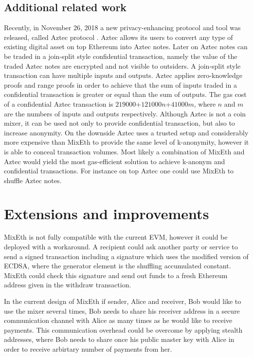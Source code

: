 \documentclass[a4paper]{article}
\theoremstyle{definition}
\begin{document}
\subsection{Additional related work}
Recently, in November 26, 2018 a new privacy-enhancing protocol and tool was released, called Aztec protocol \cite{aztecprotocol2018}. Aztec allows its users to convert any type of existing digital asset on top Ethereum into Aztec notes. Later on Aztec notes can be traded in a join-split style confidential transaction, namely the value of the traded Aztec notes are encrypted and not visible to outsiders. A join-split style transaction can have multiple inputs and outputs. Aztec applies zero-knowledge proofs and range proofs in order to achieve that the sum of inputs traded in a confidential transaction is greater or equal than the sum of outputs. The gas cost of a confidential Aztec transaction is $\num[group-separator={,}]{219000}$+$\num[group-separator={,}]{121000}n$+$\num[group-separator={,}]{41000}m$, where $n$ and $m$ are the numbers of inputs and outputs respectively.  Although Aztec is not a coin mixer, it can be used not only to provide confidential transaction, but also to increase anonymity. On the downside Aztec uses a trusted setup and considerably more expensive than MixEth to provide the same level of k-anonymity, however it is able to conceal transaction volumes. Most likely a combination of MixEth and Aztec would yield the most gas-efficient solution to achieve k-anonym and confidential transactions. For instance on top Aztec one could use MixEth to shuffle Aztec notes.      

\section{Extensions and improvements}
MixEth is not fully compatible with the current EVM, however it could be deployed with a workaround. A recipient could ask another party or service to send a signed transaction including a signature which uses the modified version of ECDSA, where the generator element is the shuffling accumulated constant. MixEth could check this signature and send out funds to a fresh Ethereum address given in the withdraw transaction.

In the current design of MixEth if sender, Alice and receiver, Bob would like to use the mixer several times, Bob needs to share his receiver address in a secure communication channel with Alice as many times as he would like to receive payments. This communication overhead could be overcome by applying stealth addresses, where Bob needs to share once his public master key with Alice in order to receive arbirtary number of payments from her.
\end{document}
